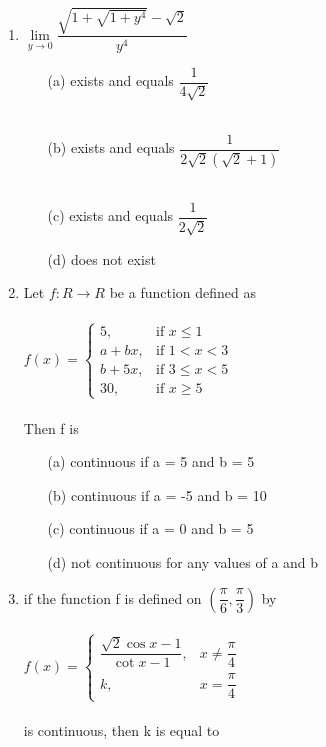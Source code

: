\begin{enumerate}[label=\arabic*.,ref=\thesubsection.\theenumi]
\item $\lim\limits_{y \to 0}\dfrac{\sqrt{1+\sqrt{1+y^4}}-\sqrt{2}}{y^4}$
\begin{itemize}
\item[(a)] exists and equals $\dfrac{1}{4\sqrt{2}}$\\ \\
\item[(b)] exists and equals $\dfrac{1}{2\sqrt{2}(\sqrt{2}+1)}$\\ \\
\item[(c)] exists and equals $\dfrac{1}{2\sqrt{2}}$\\ 
\item[(d)] does not exist
\end{itemize}

\item Let $f: R \to R$ be a function defined as\\ \\
$f(x)=\begin{cases}
5, &\text{if $x\leq 1$}\\
a+bx, &\text{if $1<x<3$}\\
b+5x, &\text{if $3\leq x<5$}\\
30, &\text{if $x\geq 5$}
\end{cases}$ \\ \\Then f is
\begin{itemize}
\item[(a)] continuous if a = 5 and b = 5
\item[(b)] continuous if a = -5 and b = 10
\item[(c)] continuous if a = 0 and b = 5
\item[(d)] not continuous for any values of a and b
\end{itemize}

\item if the function f is defined on $\left(\dfrac{\pi}{6},\dfrac{\pi}{3}\right)$ by \\ \\
$f(x)=\begin{cases}
\dfrac{\sqrt{2}\cos x-1}{\cot x-1}, &\text{$x\neq \dfrac{\pi}{4}$}\\
k, &\text{$x=\dfrac{\pi}{4}$}
\end{cases}$\\ \\ is continuous, then k is equal to
\begin{itemize}
\end{itemize}


\end{enumerate}
